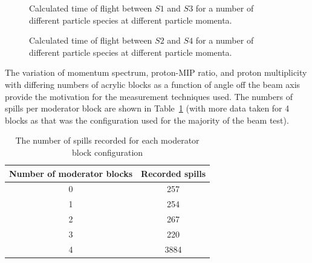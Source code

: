 \begin{figure}[ht]
  \begin{minipage}[t]{0.49\textwidth}
    \begin{adjustbox}{max totalsize={\textwidth}{.5\textheight},center}
      
    \end{adjustbox}
    \caption{Calculated time of flight between $\mathit{S1}$ and $\mathit{S3}$ for a number of different particle species at different particle momenta.}
    \label{fig:s1s3PredTimes}
  \end{minipage}
  \hfill
  \begin{minipage}[t]{0.49\textwidth}
    \begin{adjustbox}{max totalsize={\textwidth}{.5\textheight},center}
      
    \end{adjustbox}
    \caption{Calculated time of flight between $\mathit{S2}$ and $\mathit{S4}$ for a number of different particle species at different particle momenta.}
    \label{fig:s2s4PredTimes}
  \end{minipage}
\end{figure}

The variation of momentum spectrum, proton-MIP ratio, and proton multiplicity with differing numbers of acrylic blocks as a function of angle off the beam axis provide the motivation for the measurement techniques used.
The numbers of spills per moderator block are shown in Table~\ref{tab:spills} (with more data taken for 4 blocks as that was the configuration used for the majority of the beam test).

\begin{table}
  \centering
  \begin{tabular}{|c|c|}
    \hline
    Number of moderator blocks & Recorded spills \\
    \hline
    0 & 257 \\
    1 & 254 \\
    2 & 267 \\
    3 & 220 \\
    4 & 3884 \\
    \hline
  \end{tabular}
  \caption{The number of spills recorded for each moderator block configuration}
  \label{tab:spills}
\end{table}

